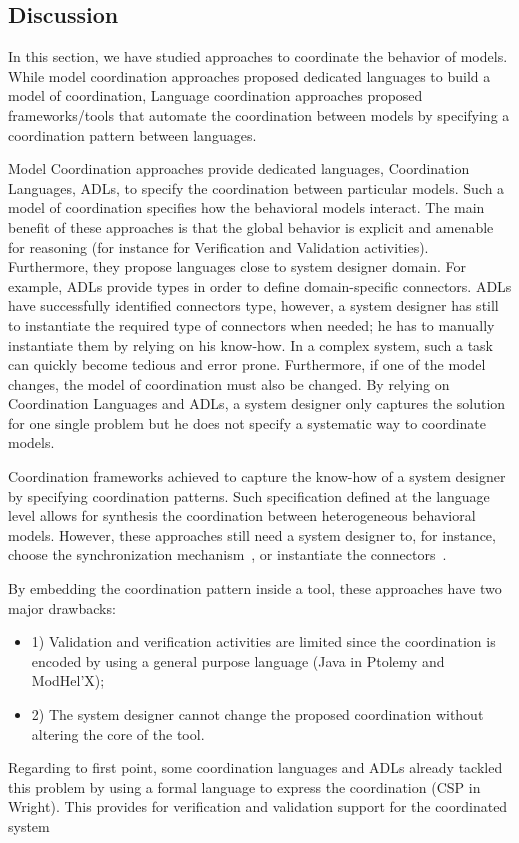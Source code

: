 \subsection{Discussion}
In this section, we have studied approaches to coordinate the behavior of models. While model coordination approaches proposed dedicated languages to build a model of coordination, Language coordination approaches proposed frameworks/tools that automate the coordination between models by specifying a coordination pattern between languages. 

Model Coordination approaches provide dedicated languages, \ie Coordination Languages, ADLs, to specify the coordination between particular models. Such a model of coordination specifies how the behavioral models interact. The main benefit of these approaches is that the global behavior is explicit and amenable for reasoning (for instance for Verification and Validation activities). Furthermore, they propose languages close to system designer domain. For example, ADLs provide types in order to define domain-specific connectors. ADLs have successfully identified connectors type, however, a system designer has still to instantiate the required type of connectors when needed; he has to manually instantiate them by relying on his know-how. In a complex system, such a task can quickly become tedious and error prone. Furthermore, if one of the model changes, the model of coordination must also be changed. By relying on Coordination Languages and ADLs, a system designer only captures the solution for one single problem but he does not specify a systematic way to coordinate models. 

Coordination frameworks achieved to capture the know-how of a system designer by specifying coordination patterns. Such specification defined at the language level allows for synthesis the coordination between heterogeneous behavioral models. However, these approaches still need a system designer to, for instance, choose the synchronization mechanism~\cite{mascotbib}, or instantiate the connectors~\cite{dinatale}.   

By embedding the coordination pattern inside a tool, these approaches have two major drawbacks:
\begin{itemize}
	\item 1) Validation and verification activities are limited since the coordination is encoded by using a general purpose language (\eg Java in Ptolemy and ModHel'X);
	\item 2) The system designer cannot change the proposed coordination without altering the core of the tool.  
\end{itemize}
Regarding to first point, some coordination languages and ADLs already tackled this problem by using a formal language to express the coordination (\eg CSP in Wright). This provides for verification and validation support for the coordinated system

